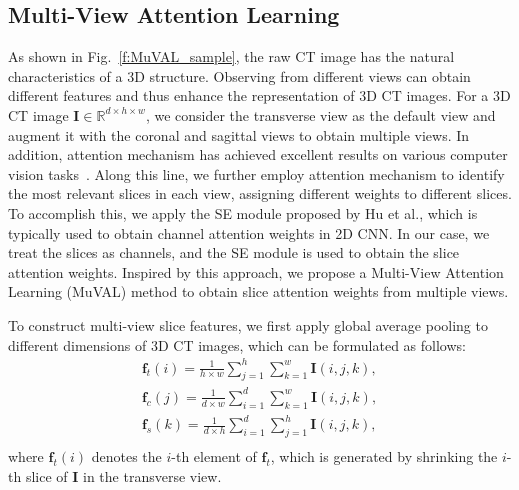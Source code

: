 \subsection{Multi-View Attention Learning}
As shown in Fig.~\ref{f:MuVAL_sample}, 
the raw CT image has the natural characteristics of a 3D structure.
Observing from different views can obtain different features and thus enhance the representation of 3D CT images.
For a 3D CT image $\bm{I}\in\mathbb{R}^{d\times h \times w}$,
we consider the transverse view as the default view and augment it with the coronal and sagittal views to obtain multiple views.
In addition, attention mechanism has achieved excellent results on various computer vision tasks~\cite{ruan2021color,ruan2021dae}.
Along this line, we further employ attention mechanism to identify the most relevant slices in each view, assigning different weights to different slices. 
To accomplish this, we apply the SE module proposed by Hu et al.\cite{hu2018squeeze}, which is typically used to obtain channel attention weights in 2D CNN. 
 In our case, we treat the slices as channels, and the SE module is used to obtain the slice attention weights. 
Inspired by this approach, we propose a Multi-View Attention Learning (MuVAL) method to obtain slice attention weights from multiple views. 

To construct multi-view slice features, we first apply global average pooling to different dimensions of 3D CT images, which can be formulated as follows: 
\begin{equation}
\begin{aligned}
    \bm{f}_t(i) = \frac{1}{h \times w}\sum_{j=1}^{h}\sum_{k=1}^{w}\bm{I}(i,j,k),\\
    \bm{f}_c(j) = \frac{1}{d \times w}\sum_{i=1}^{d}\sum_{k=1}^{w}\bm{I}(i,j,k),\\
    \bm{f}_s(k) = \frac{1}{d \times h}\sum_{i=1}^{d}\sum_{j=1}^{h}\bm{I}(i,j,k),\\
\end{aligned}
\end{equation}
where $\bm{f}_t(i)$ denotes the $i$-th element of $\bm{f}_t$, which is generated by shrinking the $i$-th slice of $\bm{I}$ in the transverse view.

